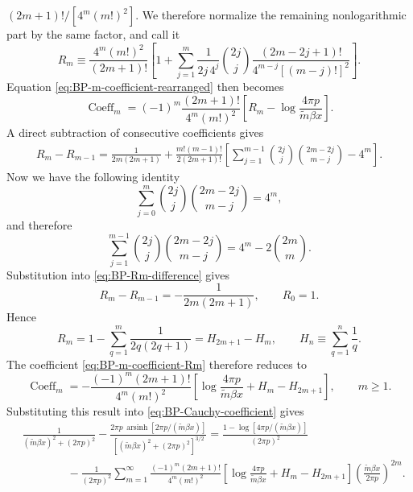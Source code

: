 \documentclass[a4paper,11pt]{article}
\begin{document}
$(2m+1)!/[4^m(m!)^2]$.  We therefore normalize the remaining
nonlogarithmic part by the same factor, and call it
\begin{equation}
	R_m
	\equiv
	\frac{4^m(m!)^2}{(2m+1)!}
	\left[
	1+
	\sum_{j=1}^{m}
	\frac{1}{2j\,4^j}
	\binom{2j}{j}
	\frac{(2m-2j+1)!}
	{4^{m-j}[(m-j)!]^2}
	\right].
	\label{eq:BP-Rm-def}
\end{equation}
Equation \eqref{eq:BP-m-coefficient-rearranged} then becomes
\begin{equation}
	\operatorname{Coeff}_{m}
	=
	(-1)^m
	\frac{(2m+1)!}{4^m(m!)^2}
	\left[
	R_m-\log\!\frac{4\pi p}{\tilde m\beta x}
	\right].
	\label{eq:BP-m-coefficient-Rm}
\end{equation}
A direct subtraction of consecutive coefficients gives
\begin{align}
	R_m-R_{m-1}
	=
	\frac{1}{2m(2m+1)}
+
	\frac{m!(m-1)!}{2(2m+1)!}
	\left[
	\sum_{j=1}^{m-1}
	\binom{2j}{j}
	\binom{2m-2j}{m-j}
	-4^m
	\right].
	\label{eq:BP-Rm-difference}
\end{align}
Now we have the following identity
\begin{equation}
	\sum_{j=0}^{m}
	\binom{2j}{j}
	\binom{2m-2j}{m-j}
	=
	4^m,
	\label{eq:BP-Vandermonde}
\end{equation}
and therefore
\begin{equation}
	\sum_{j=1}^{m-1}
	\binom{2j}{j}
	\binom{2m-2j}{m-j}
	=
	4^m-2\binom{2m}{m}.
	\label{eq:BP-Vandermonde-reduced}
\end{equation}
Substitution into \eqref{eq:BP-Rm-difference} gives
\begin{equation}
	R_m-R_{m-1}
	=
	-\frac{1}{2m(2m+1)},
	\qquad
	R_0=1.
	\label{eq:BP-Rm-recurrence}
\end{equation}
Hence
\begin{equation}
	R_m
	=
	1-\sum_{q=1}^{m}\frac{1}{2q(2q+1)}
	=
	H_{2m+1}-H_m,
	\qquad
	H_n\equiv\sum_{q=1}^{n}\frac1q .
	\label{eq:BP-harmonic-reduction}
\end{equation}
The coefficient \eqref{eq:BP-m-coefficient-Rm} therefore reduces to
\begin{equation}
	\operatorname{Coeff}_{m}
	=
	-\frac{(-1)^m(2m+1)!}{4^m(m!)^2}
	\left[
	\log\!\frac{4\pi p}{\tilde m\beta x}
	+H_m-H_{2m+1}
	\right],
	\qquad m\geq1.
	\label{eq:BP-m-coefficient-final}
\end{equation}
Substituting this result into \eqref{eq:BP-Cauchy-coefficient} gives
\begin{align}
	&\frac{1}{(\tilde m\beta x)^2+(2\pi p)^2}
	-\frac{2\pi p\,
		\operatorname{arsinh}[2\pi p/(\tilde m\beta x)]}
	{[(\tilde m\beta x)^2+(2\pi p)^2]^{3/2}}
=
	\frac{1-\log[4\pi p/(\tilde m\beta x)]}{(2\pi p)^2}
	\nonumber\\
	&\qquad\qquad
	-\frac{1}{(2\pi p)^2}
	\sum_{m=1}^{\infty}
	\frac{(-1)^m(2m+1)!}{4^m(m!)^2}
	\left[
	\log\!\frac{4\pi p}{\tilde m\beta x}
	+H_m-H_{2m+1}
	\right]
	\left(
	\frac{\tilde m\beta x}{2\pi p}
	\right)^{2m}.
	\label{eq:BP-summand-m}
\end{align}
\end{document}

